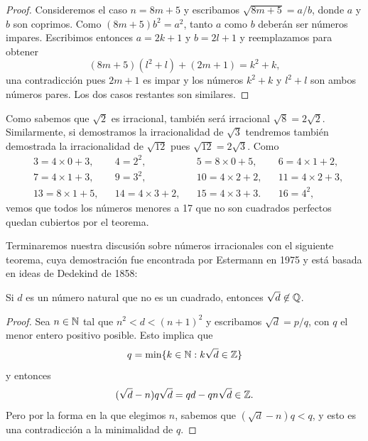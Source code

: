 \begin{proof}
	Consideremos el caso $n=8m+5$ y escribamos $\sqrt{8m+5}=a/b$, donde $a$ y
	$b$ son coprimos. Como $(8m+5)b^2=a^2$, tanto $a$ como $b$ deberán ser
	números impares. Escribimos entonces $a=2k+1$ y $b=2l+1$ y reemplazamos
	para obtener 
	\[
		(8m+5)(l^2+l)+(2m+1)=k^2+k,
	\]
	una contradicción pues $2m+1$ es impar y los números $k^2+k$ y
	$l^2+l$ son ambos números pares.  Los dos casos restantes son
	similares. 
\end{proof}

Como sabemos que $\sqrt{2}$ es irracional, también será irracional
$\sqrt{8}=2\sqrt{2}$.  Similarmente, si demostramos la irracionalidad de
$\sqrt{3}$ tendremos también demostrada la irracionalidad de $\sqrt{12}$ pues
$\sqrt{12}=2\sqrt{3}$. Como
\begin{align*}
	&3=4\times 0+3, 
	&&4=2^2,
	&& 5=8\times 0+5,
	&& 6=4\times 1+2,\\
	& 7=4\times 1+3,
	&& 9=3^2,
	&& 10=4\times 2+2,
	&& 11=4\times 2+3,\\
	& 13=8\times 1+5,
	&& 14=4\times 3+2,
	&& 15=4\times 3+3.
	&& 16=4^2,
\end{align*}
vemos que todos los números menores a 17 que no son cuadrados perfectos quedan
cubiertos por el teorema. 




Terminaremos nuestra discusión sobre números irracionales con el siguiente
teorema, cuya demostración fue encontrada por Estermann en 1975 y está basada
en ideas de Dedekind de 1858:

\begin{theorem}
	Si $d$ es un número natural que no es un cuadrado, entonces
	$\sqrt{d}\not\in\mathbb{Q}$.
\end{theorem}

\begin{proof}
	Sea $n\in\mathbb{N}$ tal que $n^2<d<(n+1)^2$ y escribamos $\sqrt{d}=p/q$, con $q$ el menor
	entero positivo posible. Esto implica que 
	\[
	q=\min\{k\in\mathbb{N}:k\sqrt{d}\in\mathbb{Z}\}
	\]
	y entonces
	\[
		(\sqrt{d}-n)q\sqrt{d}=qd-qn\sqrt{d}\in\mathbb{Z}.
	\]
	Pero por la forma en la que elegimos $n$, sabemos que $(\sqrt{d}-n)q<q$, y
	esto es una contradicción a la minimalidad de $q$.
\end{proof}

